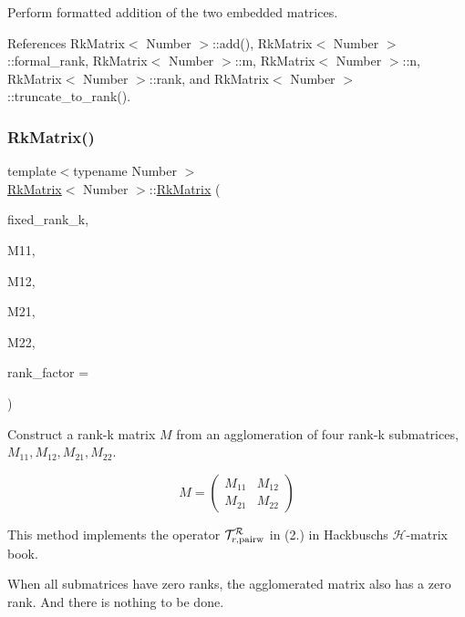 Perform formatted addition of the two embedded matrices.

References Rk\+Matrix$<$ Number $>$\+::add(), Rk\+Matrix$<$ Number $>$\+::formal\+\_\+rank, Rk\+Matrix$<$ Number $>$\+::m, Rk\+Matrix$<$ Number $>$\+::n, Rk\+Matrix$<$ Number $>$\+::rank, and Rk\+Matrix$<$ Number $>$\+::truncate\+\_\+to\+\_\+rank().

\mbox{\label{classRkMatrix_ab2826404ecbffa257d56feac015a4c5f}} 
\subsubsection{\texorpdfstring{Rk\+Matrix()}{RkMatrix()}\hspace{0.1cm}{\footnotesize\ttfamily [16/18]}}
{\footnotesize\ttfamily template$<$typename Number $>$ \\
\hyperlink{classRkMatrix}{Rk\+Matrix}$<$ Number $>$\+::\hyperlink{classRkMatrix}{Rk\+Matrix} (\begin{DoxyParamCaption}\item[{const \hyperlink{classRkMatrix_add060bfc3a4cc77f858c3d6dd58cadd5}{size\+\_\+type}}]{fixed\+\_\+rank\+\_\+k,  }\item[{const \hyperlink{classRkMatrix}{Rk\+Matrix}$<$ Number $>$ \&}]{M11,  }\item[{const \hyperlink{classRkMatrix}{Rk\+Matrix}$<$ Number $>$ \&}]{M12,  }\item[{const \hyperlink{classRkMatrix}{Rk\+Matrix}$<$ Number $>$ \&}]{M21,  }\item[{const \hyperlink{classRkMatrix}{Rk\+Matrix}$<$ Number $>$ \&}]{M22,  }\item[{const Number}]{rank\+\_\+factor = {} }\end{DoxyParamCaption})}

Construct a rank-\/k matrix $M$ from an agglomeration of four rank-\/k submatrices, $M_{11}, M_{12}, M_{21}, M_{22}$.

\[ M = \begin{pmatrix} M_{11} & M_{12} \\ M_{21} & M_{22} \end{pmatrix} \]


\begin{DoxyDescription}
\item[Note ]This method implements the operator $\mathcal{T}_{r, {\rm pairw}}^{\mathcal{R}}$ in (2.) in Hackbusch\textquotesingle{}s $\mathcal{H}$-\/matrix book. 
\end{DoxyDescription}When all submatrices have zero ranks, the agglomerated matrix also has a zero rank. And there is nothing to be done.

